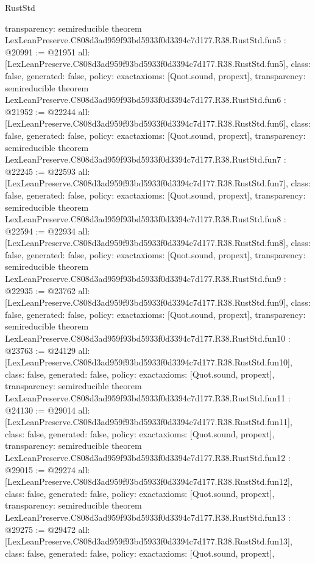 \begin{lexlean}{RustStd}
\begin{coremodule}
{  transparency: semireducible
}
theorem LexLeanPreserve.C808d3ad959f93bd5933f0d3394c7d177.R38.RustStd.fun5 : @20991 := @21951 {
  all: [LexLeanPreserve.C808d3ad959f93bd5933f0d3394c7d177.R38.RustStd.fun5],
  class: false,
  generated: false,
  policy: exact{axioms: [Quot.sound, propext]},
  transparency: semireducible
}
theorem LexLeanPreserve.C808d3ad959f93bd5933f0d3394c7d177.R38.RustStd.fun6 : @21952 := @22244 {
  all: [LexLeanPreserve.C808d3ad959f93bd5933f0d3394c7d177.R38.RustStd.fun6],
  class: false,
  generated: false,
  policy: exact{axioms: [Quot.sound, propext]},
  transparency: semireducible
}
theorem LexLeanPreserve.C808d3ad959f93bd5933f0d3394c7d177.R38.RustStd.fun7 : @22245 := @22593 {
  all: [LexLeanPreserve.C808d3ad959f93bd5933f0d3394c7d177.R38.RustStd.fun7],
  class: false,
  generated: false,
  policy: exact{axioms: [Quot.sound, propext]},
  transparency: semireducible
}
theorem LexLeanPreserve.C808d3ad959f93bd5933f0d3394c7d177.R38.RustStd.fun8 : @22594 := @22934 {
  all: [LexLeanPreserve.C808d3ad959f93bd5933f0d3394c7d177.R38.RustStd.fun8],
  class: false,
  generated: false,
  policy: exact{axioms: [Quot.sound, propext]},
  transparency: semireducible
}
theorem LexLeanPreserve.C808d3ad959f93bd5933f0d3394c7d177.R38.RustStd.fun9 : @22935 := @23762 {
  all: [LexLeanPreserve.C808d3ad959f93bd5933f0d3394c7d177.R38.RustStd.fun9],
  class: false,
  generated: false,
  policy: exact{axioms: [Quot.sound, propext]},
  transparency: semireducible
}
theorem LexLeanPreserve.C808d3ad959f93bd5933f0d3394c7d177.R38.RustStd.fun10 : @23763 := @24129 {
  all: [LexLeanPreserve.C808d3ad959f93bd5933f0d3394c7d177.R38.RustStd.fun10],
  class: false,
  generated: false,
  policy: exact{axioms: [Quot.sound, propext]},
  transparency: semireducible
}
theorem LexLeanPreserve.C808d3ad959f93bd5933f0d3394c7d177.R38.RustStd.fun11 : @24130 := @29014 {
  all: [LexLeanPreserve.C808d3ad959f93bd5933f0d3394c7d177.R38.RustStd.fun11],
  class: false,
  generated: false,
  policy: exact{axioms: [Quot.sound, propext]},
  transparency: semireducible
}
theorem LexLeanPreserve.C808d3ad959f93bd5933f0d3394c7d177.R38.RustStd.fun12 : @29015 := @29274 {
  all: [LexLeanPreserve.C808d3ad959f93bd5933f0d3394c7d177.R38.RustStd.fun12],
  class: false,
  generated: false,
  policy: exact{axioms: [Quot.sound, propext]},
  transparency: semireducible
}
theorem LexLeanPreserve.C808d3ad959f93bd5933f0d3394c7d177.R38.RustStd.fun13 : @29275 := @29472 {
  all: [LexLeanPreserve.C808d3ad959f93bd5933f0d3394c7d177.R38.RustStd.fun13],
  class: false,
  generated: false,
  policy: exact{axioms: [Quot.sound, propext]},
}
\end{coremodule}
\end{lexlean}
